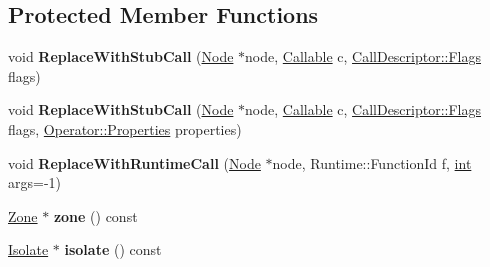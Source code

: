 \subsection*{Protected Member Functions}
\begin{DoxyCompactItemize}
\item 
\mbox{\label{classv8_1_1internal_1_1compiler_1_1JSGenericLowering_acb812a927897d9aee2d5fa42ad8425ad}} 
void {\bfseries Replace\+With\+Stub\+Call} (\mbox{\hyperlink{classv8_1_1internal_1_1compiler_1_1Node}{Node}} $\ast$node, \mbox{\hyperlink{classv8_1_1internal_1_1Callable}{Callable}} c, \mbox{\hyperlink{classv8_1_1base_1_1Flags}{Call\+Descriptor\+::\+Flags}} flags)
\item 
\mbox{\label{classv8_1_1internal_1_1compiler_1_1JSGenericLowering_ab20b9e1e963628ad051e12300d278f98}} 
void {\bfseries Replace\+With\+Stub\+Call} (\mbox{\hyperlink{classv8_1_1internal_1_1compiler_1_1Node}{Node}} $\ast$node, \mbox{\hyperlink{classv8_1_1internal_1_1Callable}{Callable}} c, \mbox{\hyperlink{classv8_1_1base_1_1Flags}{Call\+Descriptor\+::\+Flags}} flags, \mbox{\hyperlink{classv8_1_1base_1_1Flags}{Operator\+::\+Properties}} properties)
\item 
\mbox{\label{classv8_1_1internal_1_1compiler_1_1JSGenericLowering_a39abc5ee3c04bde1be94d223e467aa2e}} 
void {\bfseries Replace\+With\+Runtime\+Call} (\mbox{\hyperlink{classv8_1_1internal_1_1compiler_1_1Node}{Node}} $\ast$node, Runtime\+::\+Function\+Id f, \mbox{\hyperlink{classint}{int}} args=-\/1)
\item 
\mbox{\label{classv8_1_1internal_1_1compiler_1_1JSGenericLowering_a48291ee4f32fc4bbc63c640021721e0e}} 
\mbox{\hyperlink{classv8_1_1internal_1_1Zone}{Zone}} $\ast$ {\bfseries zone} () const
\item 
\mbox{\label{classv8_1_1internal_1_1compiler_1_1JSGenericLowering_a328a62b8c396387133f32721c2eb3c38}} 
\mbox{\hyperlink{classv8_1_1internal_1_1Isolate}{Isolate}} $\ast$ {\bfseries isolate} () const
\item 
\mbox{\label{classv8_1_1internal_1_1compiler_1_1JSGenericLowering_ad389c0dc887810fa23984f8c684fe926}} 

\end{DoxyCompactItemize}
